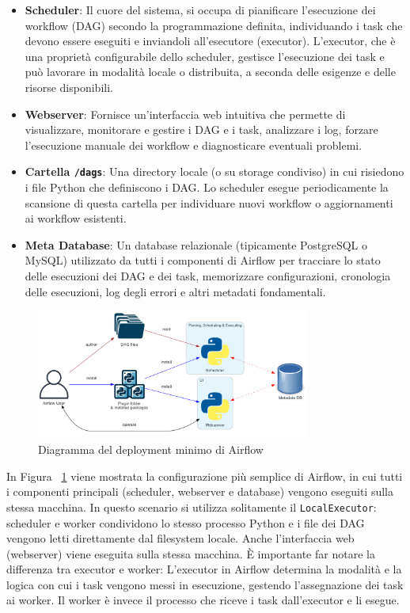 \begin{itemize}
    \item \textbf{Scheduler}: Il cuore del sistema, si occupa di pianificare l'esecuzione dei workflow (DAG) secondo la programmazione definita, individuando i task che devono essere eseguiti e inviandoli all'esecutore (executor). L'executor, che è una proprietà configurabile dello scheduler, gestisce l'esecuzione dei task e può lavorare in modalità locale o distribuita, a seconda delle esigenze e delle risorse disponibili.
    \item \textbf{Webserver}: Fornisce un'interfaccia web intuitiva che permette di visualizzare, monitorare e gestire i DAG e i task, analizzare i log, forzare l'esecuzione manuale dei workflow e diagnosticare eventuali problemi.
    \item \textbf{Cartella \texttt{/dags}}: Una directory locale (o su storage condiviso) in cui risiedono i file Python che definiscono i DAG. Lo scheduler esegue periodicamente la scansione di questa cartella per individuare nuovi workflow o aggiornamenti ai workflow esistenti.
    \item \textbf{Meta Database}: Un database relazionale (tipicamente PostgreSQL o MySQL) utilizzato da tutti i componenti di Airflow per tracciare lo stato delle esecuzioni dei DAG e dei task, memorizzare configurazioni, cronologia delle esecuzioni, log degli errori e altri metadati fondamentali.
\end{itemize}

\begin{figure}[h]
    \centering
    \includegraphics[width=0.8\textwidth]{img/diagram_basic_airflow_architecture.png}
    \caption{Diagramma del deployment minimo di Airflow}
    \label{fig:airflow_minimal_deployment}
\end{figure}

In Figura ~\ref{fig:airflow_minimal_deployment} viene mostrata la configurazione più semplice di Airflow, in cui tutti i componenti principali (scheduler, webserver e database) vengono eseguiti sulla stessa macchina. In questo scenario si utilizza solitamente il \texttt{LocalExecutor}: scheduler e worker condividono lo stesso processo Python e i file dei DAG vengono letti direttamente dal filesystem locale. Anche l’interfaccia web (webserver) viene eseguita sulla stessa macchina. È importante far notare la differenza tra executor e worker: 
L’executor in Airflow determina la modalità e la logica con cui i task vengono messi in esecuzione, gestendo l’assegnazione dei task ai worker.
Il worker è invece il processo che riceve i task dall’executor e li esegue.

